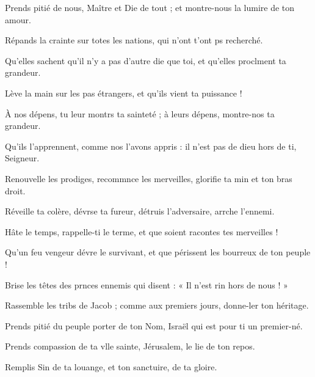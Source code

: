 \item Prends pitié de nous, Maître et Die de tout ;\psstar{} et montre-nous la lumire de ton amour.
\item Répands la crainte sur totes les nations,\psstar{} qui n'ont t'ont ps recherché.
\item Qu'elles sachent qu'il n'y a pas d'autre die que toi,\psstar{} et qu'elles proclment ta grandeur.
\item Lève la main sur les pas étrangers,\psstar{} et qu’ils vient ta puissance !
\item À nos dépens, tu leur montrs ta sainteté ;\psstar{} à leurs dépens, montre-nos ta grandeur.
\item Qu’ils l’apprennent, comme nos l’avons appris :\psstar{} il n’est pas de dieu hors de ti, Seigneur.
\item Renouvelle les prodiges, recommnce les merveilles,\psstar{} glorifie ta min et ton bras droit.
\item Réveille ta colère, dévrse ta fureur,\psstar{} détruis l’adversaire, arrche l’ennemi.
\item Hâte le temps, rappelle-ti le terme,\psstar{} et que soient racontes tes merveilles !
\item Qu’un feu vengeur dévre le survivant,\psstar{} et que périssent les bourreux de ton peuple !
\item Brise les têtes des prnces ennemis\psstar{} qui disent : « Il n’est rin hors de nous ! »
\item Rassemble les tribs de Jacob ;\psstar{} comme aux premiers jours, donne-ler ton héritage.
\item Prends pitié du peuple porter de ton Nom,\psstar{} Israël qui est pour ti un premier-né.
\item Prends compassion de ta vlle sainte,\psstar{} Jérusalem, le lie de ton repos.
\item Remplis Sin de ta louange,\psstar{} et ton sanctuire, de ta gloire.